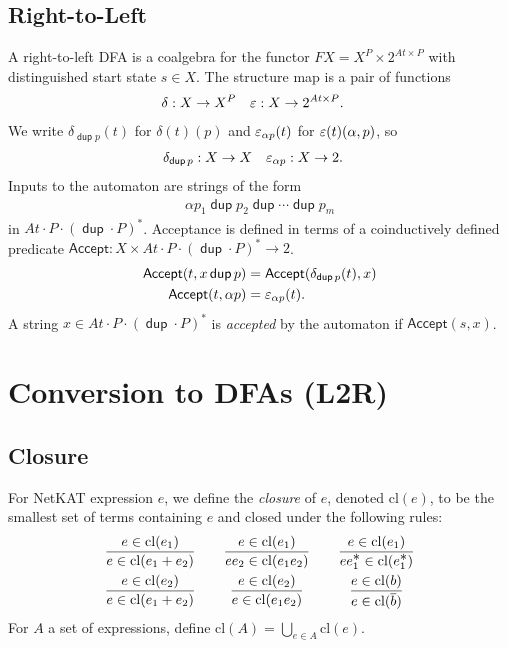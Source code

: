 \documentclass{article}
\newcommand\At{\ensuremath{\mathit{At}}}
\newcommand\pdup{\mathop{\mathsf{dup}}}
\renewcommand\star{^{\textstyle *}}
\newcommand\acc{\mathsf{Accept}}
\newcommand\clname{\mathrm{cl}}
\newcommand\cl[1]{\clname(#1)}
\begin{document}
\subsection*{Right-to-Left}

A right-to-left DFA is a coalgebra for the functor $FX = X^{P}\times 2^{\At\times P}$ with distinguished start state $s\in X$. The structure map is a pair of functions
\begin{align*}
\delta &: X\to X^{P} & \eps &: X\to 2^{\At\times P}.
\end{align*}
We write $\delta_{\pdup p}(t)$ for $\delta(t)(p)$ and $\varepsilon_{\alpha p}(t)$ for $\varepsilon(t)(\alpha,p)$, so
\begin{align*}
\delta_{\pdup p} &: X\to X & \eps_{\alpha p} &: X\to 2.
\end{align*}
Inputs to the automaton are strings of the form
\begin{align*}
\alpha p_1\pdup p_2\pdup\cdots\pdup p_m
\end{align*}
in $\At\cdot P\cdot(\pdup\cdot P)\star$. Acceptance is defined in terms of a coinductively defined predicate $\acc:X\times\At\cdot P\cdot(\pdup\cdot P)\star\to 2$.
\begin{align*}
\acc(t,x\pdup p) &= \acc(\delta_{\pdup p}(t),x)\\
\acc(t,\alpha p) &= \eps_{\alpha p}(t).
\end{align*}
A string $x\in\At\cdot P\cdot(\pdup\cdot P)\star$ is \emph{accepted} by the automaton if $\acc(s,x)$.

\section*{Conversion to DFAs (L2R)}

\newcommand\repname{R}
\newcommand\repone[1]{\repname(#1)}
\newcommand\rep[2]{\repname(#2)(#1)}
\newcommand\pfun\rightharpoonup
\newcommand\arity[1]{\mathrm{arity}(#1)}

\subsection*{Closure}

For NetKAT expression $e$, we define the \emph{closure} of $e$, denoted $\cl e$, to be the smallest set
of terms containing $e$ and closed under the following rules:
\begin{equation}
\begin{array}{c@{\qquad}c@{\qquad}c}
\dfrac{e\in\cl{e_1}}{e\in\cl{e_1+e_2}} & \dfrac{e\in\cl{e_1}}{ee_2\in\cl{e_1e_2}} & \dfrac{e\in\cl{e_1}}{ee_1\star\in\cl{e_1\star}}\\[1em]
\dfrac{e\in\cl{e_2}}{e\in\cl{e_1+e_2}} & \dfrac{e\in\cl{e_2}}{e\in\cl{e_1e_2}} & \dfrac{e\in\cl{b}}{e\in\cl{\bar b}}
\end{array}
\label{eq:cldef}
\end{equation}
For $A$ a set of expressions, define $\cl A = \bigcup_{e\in A} \cl e$.
\end{document}
